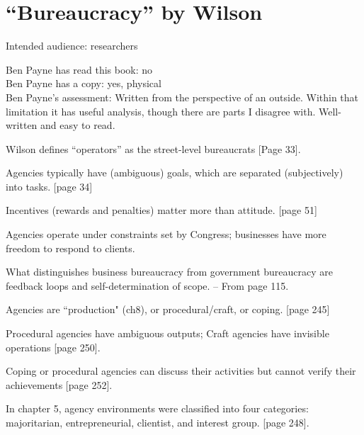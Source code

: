 \section{``Bureaucracy'' by Wilson}

\cite{1991_Wilson}

Intended audience: researchers

Ben Payne has read this book: no\\
Ben Payne has a copy: yes, physical\\
Ben Payne's assessment: Written from the perspective of an outside. Within that limitation it has useful analysis, though there are parts I disagree with. Well-written and easy to read.


Wilson defines ``operators'' as the street-level bureaucrats [Page 33].

Agencies typically have (ambiguous) goals, which are separated (subjectively) into tasks. [page 34]

Incentives (rewards and penalties) matter more than attitude.
[page 51]

Agencies operate under constraints set by Congress; businesses have more freedom to respond to clients.

What distinguishes business bureaucracy from government bureaucracy are feedback loops and self-determination of scope. -- From page 115.

Agencies are ``production" (ch8), or procedural/craft, or coping.
[page 245]

Procedural agencies have ambiguous outputs; Craft agencies have invisible operations
[page 250].

Coping or procedural agencies can discuss their activities but cannot verify their achievements
[page 252].

In chapter 5, agency environments were classified into four categories: majoritarian, entrepreneurial, clientist, and interest group.
[page 248].
